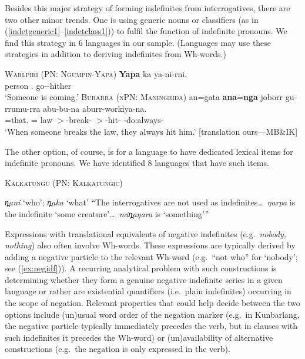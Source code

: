 \documentclass[12pt,egregdoesnotlikesansseriftitles]{scrartcl}
\begin{document}
Besides this major strategy of forming indefinites from interrogatives, there are two other minor trends. One is using generic nouns or classifiers (as in (\ref{indetgeneric1}--\ref{indetclass1})) to fulfil the function of indefinite pronouns. We find this strategy in 6 languages in our sample. (Languages may use these strategies in addition to deriving indefinites from Wh-words.)
\begin{exe}
  \ex \textsc{Warlpiri (PN: Ngumpin-Yapa)} \hfill \citep{wdp}
  \gll \textbf{Yapa} ka ya-ni-rni.\\
  person \Aux.\Prs{} go-\Np-hither\\
  `Someone is coming.' \label{indetgeneric1}  
  \ex\label{indetclass1} \textsc{Burarra (nPN: Maningrida)}\hfill {}
  \gll an=gata    \textbf{ana}=\textbf{nga}            joborr    gu-rrumu-rra  abu-bu-na            aburr-workiya-na.\\
  \Third\Min=that.\Rcgn{}   \Third\Min\Hum=\Indet{}   law     \Third\Min$>$\Third\Min-break-\Pc{}  \Third\Aug$>$\Third\Min-hit-\Pc{}    \Third\Aug-do:always-\Pc\\
  \glt `When someone breaks the law, they always hit him.' [translation ours---MB\&IK]
  \end{exe}
  
The other option, of course, is for a language to have dedicated lexical items for indefinite pronouns. We have identified 8 languages that have such items.
\begin{exe}
  \ex \textsc{Kalkatungu (PN: Kalkatungic)}\hfill {}
  \begin{xlist}
    \ex \textit{\charis n̪ani} `who'; \textit{\charis n̪aka} `what'
    \ex ``The interrogatives are not used as indefinites\ldots\ \textit{\charis ŋarpa} is the indefinite `some creature'\ldots\ \textit{\charis min̪aŋara} is `something'\thinspace''
  \end{xlist}
\end{exe}

Expressions with translational equivalents of negative indefinites (e.g.\ \textit{nobody, nothing})  also often involve Wh-words. These expressions are typically derived by adding a negative particle to the relevant Wh-word (e.g.\ ``not who'' for `nobody'; see (\ref{ex:negidf})). A recurring analytical problem with such constructions is determining whether they form a genuine negative indefinite series in a given language or rather are existential quantifiers (i.e.\ plain indefinites) occurring in the scope of negation. %
Relevant properties that could help decide between the two options include (un)usual word order of the negation marker (e.g.\ in Kunbarlang, the negative particle typically immediately precedes the verb, but in clauses with such indefinites it precedes the Wh-word) or (un)availability of alternative constructions (e.g.\ the negation is only expressed in the verb).
\end{document}
